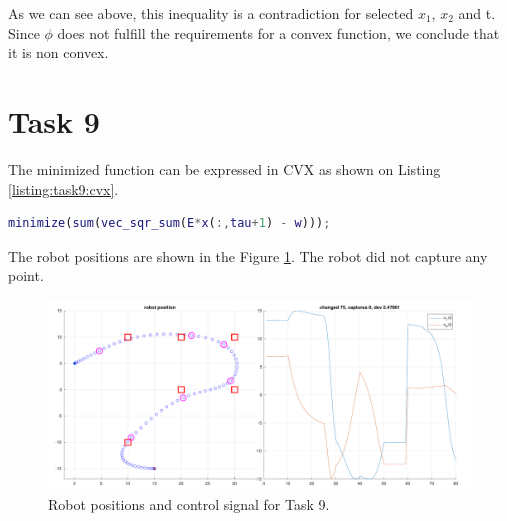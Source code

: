 As we can see above, this inequality is a contradiction for selected $x_{1}$, $x_{2}$ and t. Since $\phi$ does not fulfill the requirements for a convex function, we conclude that it is non convex.

\section {Task 9}

The minimized function can be expressed in CVX as shown on Listing \ref{listing:task9:cvx}.

\begin{lstlisting}[language=Matlab, caption=CVX code for task 9., label=listing:task9:cvx]
minimize(sum(vec_sqr_sum(E*x(:,tau+1) - w)));
\end{lstlisting}

The robot positions are shown in the Figure \ref{fig:task9:graph}. The robot did not capture any point.

\begin{figure}[!htb]
    \caption{Robot positions and control signal for Task 9.}
    \label{fig:task9:graph}
    \centering    
    \includegraphics[width=1\linewidth]{part1/figures/task_9.pdf}
\end{figure}

